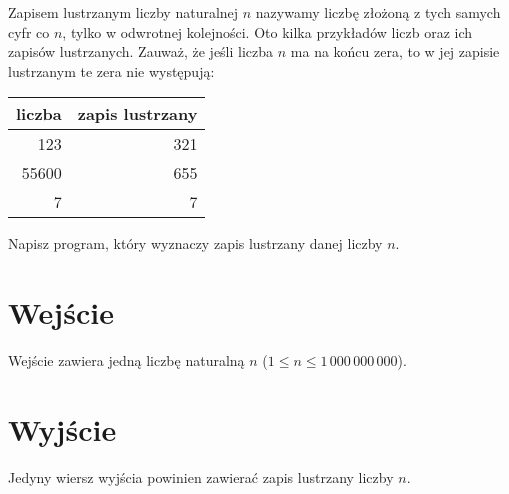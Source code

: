 \documentclass{spiral-kurs}
\begin{document}
\makeheader
%
    Zapisem lustrzanym liczby naturalnej $n$ nazywamy liczbę złożoną
    z tych samych cyfr co $n$, tylko w odwrotnej kolejności.
    Oto kilka przykładów liczb oraz ich zapisów lustrzanych.
    Zauważ, że jeśli liczba $n$ ma na końcu zera, to w jej zapisie
    lustrzanym te zera nie występują:

    \begin{center}
      \begin{tabular}{|r|r|}
        \hline
        liczba & zapis lustrzany\\\hline
           123 & 321\\\hline
         55600 & 655\\\hline
             7 & 7 \\\hline
      \end{tabular}
    \end{center}

    \noindent
    Napisz program, który wyznaczy zapis lustrzany danej liczby $n$.

    \section{Wejście}
    Wejście zawiera jedną liczbę naturalną $n$
    ($1 \le n \le 1\,000\,000\,000$).

    \section{Wyjście}
    Jedyny wiersz wyjścia powinien zawierać zapis lustrzany liczby $n$.



  
\end{document}
